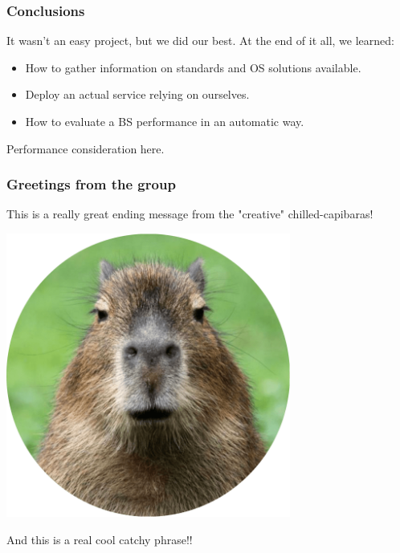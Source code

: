 \begin{frame} \frametitle{Conclusions}

	It wasn't an easy project, but we did our best. At the end of it all, we 
	learned:
	\vfill
	\begin{itemize}
		\item How to gather information on standards and OS solutions available.
		\item Deploy an actual service relying on ourselves.
		\item How to evaluate a BS performance in an automatic way.
	\end{itemize}
	\vfill
	Performance consideration here.

\end{frame}

\begin{frame} \frametitle{Greetings from the group}

	This is a really great ending message from the "creative" chilled-capibaras!
	\vfill
	\begin{center}
		\includegraphics[width=0.7\textwidth]{img/capibara}
	\end{center}
	\vfill
	\begin{center}
		And this is a real cool catchy phrase!!
	\end{center}

\end{frame}